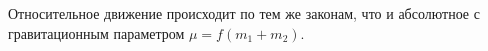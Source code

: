 Относительное движение происходит по тем же законам, что и абсолютное
с гравитационным параметром
$\mu=f(m_1+m_2)$.
